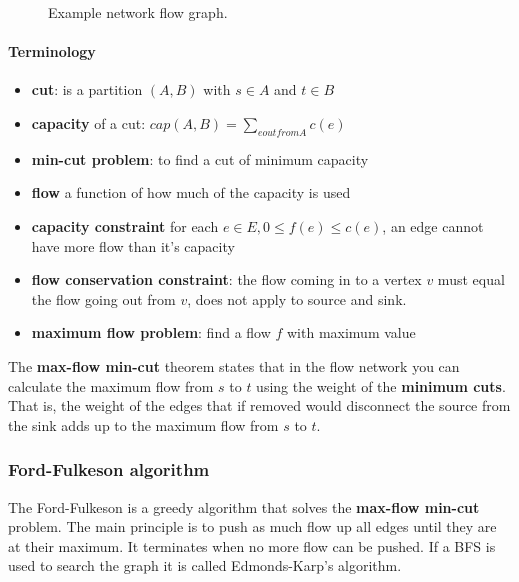 \documentclass[12pt]{article} %
\begin{document}
\begin{figure}[H]
\caption{Example network flow graph.}
\label{flow}
\end{figure} 

\paragraph{Terminology}
\begin{itemize}
    \item \textbf{cut}: is a partition $(A, B)$ with $s \in A$ and $t \in B$
    \item \textbf{capacity} of a cut: $cap(A, B) = \sum_{e out from A} c(e)$
    \item \textbf{min-cut problem}: to find a cut of minimum capacity
    \item \textbf{flow} a function of how much of the capacity is used
    \item \textbf{capacity constraint} for each $e \in E, 0 \leq f(e) \leq c(e)$, an edge cannot have more flow than it's capacity
    \item \textbf{flow conservation constraint}: the flow coming in to a vertex $v$ must equal the flow going out from $v$, does not apply to source and sink.
    \item \textbf{maximum flow problem}: find a flow $f$ with maximum value
\end{itemize}

\par The \textbf{max-flow min-cut} theorem states that in the flow network you can calculate the maximum flow from $s$ to $t$ using the weight of the \textbf{minimum cuts}. That is, the weight of the edges that if removed would disconnect the source from the sink adds up to the maximum flow from $s$ to $t$.

\subsubsection{Ford-Fulkeson algorithm}
The Ford-Fulkeson is a greedy algorithm that solves the \textbf{max-flow min-cut} problem. The main principle is to push as much flow up all edges until they are at their maximum. It terminates when no more flow can be pushed. If a BFS is used to search the graph it is called Edmonds-Karp's algorithm.
\end{document}
